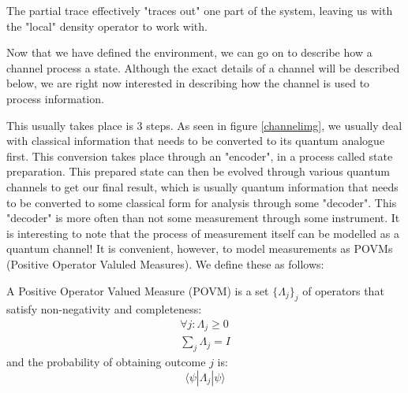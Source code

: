 The partial trace effectively "traces out" one part of the system, leaving us with the "local" density operator to work with.

Now that we have defined the environment, we can go on to describe how a channel process a state. Although
the exact details of a channel will be described below, we are right now interested in describing how
the channel is used to process information.

This usually takes place is 3 steps. As seen in figure \ref{channelimg}, we usually deal with classical
information that needs to be converted to its quantum analogue first. This conversion takes place
through an "encoder", in a process called state preparation. This prepared state can then be evolved
through various quantum channels to get our final result, which is usually quantum information that
needs to be converted to some classical form for analysis through some "decoder". This "decoder" is
more often than not some measurement through some instrument. It is interesting to note that the process
of measurement itself can be modelled as a quantum channel! It is convenient, however, to model
measurements as POVMs (Positive Operator Valuled Measures). We define these as follows:

\begin{definition}[POVM]
    A Positive Operator Valued Measure (POVM) is a set $\{\Lambda_j\}_j$ of operators that satisfy
    non-negativity and completeness:
    \begin{align*}
        \forall j : \Lambda_j \geq 0 \\
        \displaystyle\sum_{j} \Lambda_j = I
    \end{align*}
    and the probability of obtaining outcome $j$ is:
    \begin{equation*}
        \langle \psi | \Lambda_j | \psi \rangle
    \end{equation*}
\end{definition}

